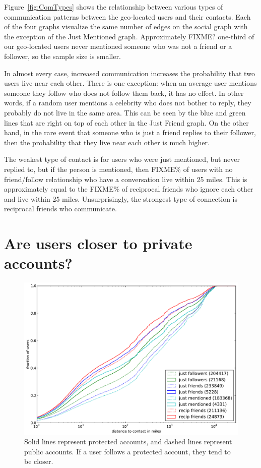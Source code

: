Figure~\ref{fig:ComTypes} shows the relationship between various types of
communication patterns between the geo-located users and their contacts.
Each of the four graphs visualize the same number of edges on the social graph
with the exception of the Just Mentioned graph. Approximately FIXME? one-third of our
geo-located users never mentioned someone who was not a friend or a follower,
so the sample size is smaller.

In almost every case, increased communication increases the probability that
two users live near each other.
There is one exception: when an average user mentions someone they follow who
does not follow them back, it has no effect.
In other words, if a random user mentions a celebrity who does not bother to
reply, they probably do not live in the same area. This can be seen by the blue
and green lines that are right on top of each other in the Just Friend graph.
On the other hand, in the rare event that someone who is just a friend replies
to their follower, then the probability that they live near each other is much
higher.

The weakest type of contact is for users who were just mentioned, but never
replied to, but if the person is mentioned, then FIXME\% of users with no
friend/follow relationship who have a conversation live within 25 miles.
This is approximately equal to the FIXME\% of reciprocal friends who ignore each
other and live within 25 miles.
Unsurprisingly, the strongest type of connection is reciprocal friends who
communicate.


\section{Are users closer to private accounts?}

\begin{figure}[h]
\centering
\includegraphics[width=\linewidth]{figures/edge_types_prot.pdf}
\caption{Solid lines represent protected accounts, and dashed lines represent public accounts. If a user follows a protected account, they tend to be closer.}
\label{fig:EdgeTypesProt}
\end{figure}


